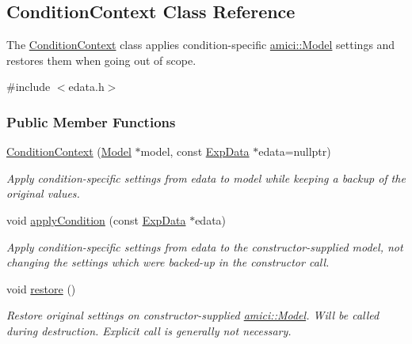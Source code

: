\hypertarget{classamici_1_1_condition_context}{}\subsection{Condition\+Context Class Reference}
\label{classamici_1_1_condition_context}


The \mbox{\hyperlink{classamici_1_1_condition_context}{Condition\+Context}} class applies condition-\/specific \mbox{\hyperlink{classamici_1_1_model}{amici\+::\+Model}} settings and restores them when going out of scope.  




{\ttfamily \#include $<$edata.\+h$>$}

\subsubsection*{Public Member Functions}
\begin{DoxyCompactItemize}
\item 
\mbox{\hyperlink{classamici_1_1_condition_context_a00922f8e090c4171074b23690161c3bd}{Condition\+Context}} (\mbox{\hyperlink{classamici_1_1_model}{Model}} $\ast$model, const \mbox{\hyperlink{classamici_1_1_exp_data}{Exp\+Data}} $\ast$edata=nullptr)
\begin{DoxyCompactList}\small\item\em Apply condition-\/specific settings from edata to model while keeping a backup of the original values. \end{DoxyCompactList}\item 
void \mbox{\hyperlink{classamici_1_1_condition_context_a3afbbd4b46cbd46cbc07960705492843}{apply\+Condition}} (const \mbox{\hyperlink{classamici_1_1_exp_data}{Exp\+Data}} $\ast$edata)
\begin{DoxyCompactList}\small\item\em Apply condition-\/specific settings from edata to the constructor-\/supplied model, not changing the settings which were backed-\/up in the constructor call. \end{DoxyCompactList}\item 
\mbox{\label{classamici_1_1_condition_context_afd3595051be2709847c2de4352f27cf5}} 
void \mbox{\hyperlink{classamici_1_1_condition_context_afd3595051be2709847c2de4352f27cf5}{restore}} ()
\begin{DoxyCompactList}\small\item\em Restore original settings on constructor-\/supplied \mbox{\hyperlink{classamici_1_1_model}{amici\+::\+Model}}. Will be called during destruction. Explicit call is generally not necessary. \end{DoxyCompactList}\end{DoxyCompactItemize}


